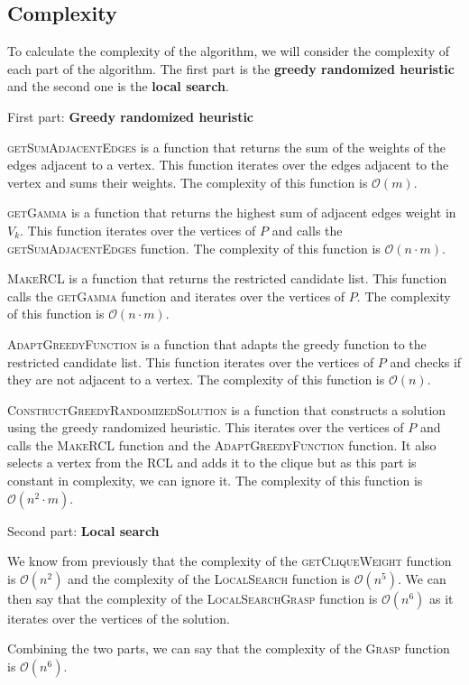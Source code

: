 
\subsection{Complexity}

To calculate the complexity of the algorithm, we will consider the complexity of
each part of the algorithm. The first part is the \textbf{greedy randomized heuristic}
and the second one is the \textbf{local search}.
\bigskip

First part: \textbf{Greedy randomized heuristic}
\bigskip

\textsc{getSumAdjacentEdges} is a function that returns the sum of the weights of
the edges adjacent to a vertex. This function iterates over the edges adjacent to
the vertex and sums their weights. The complexity of this function is $\mathcal{O}(m)$.
\bigskip

\textsc{getGamma} is a function that returns the highest sum of adjacent edges
weight in $V_k$. This function iterates over the vertices of $P$ and calls the
\textsc{getSumAdjacentEdges} function. The complexity of this function is
$\mathcal{O}(n\cdot m)$.
\bigskip

\textsc{MakeRCL} is a function that returns the restricted candidate list. This
function calls the \textsc{getGamma} function and iterates over the vertices of
$P$. The complexity of this function is $\mathcal{O}(n\cdot m)$.
\bigskip

\textsc{AdaptGreedyFunction} is a function that adapts the greedy function to the
restricted candidate list. This function iterates over the vertices of $P$ and
checks if they are not adjacent to a vertex. The complexity of this function is
$\mathcal{O}(n)$.
\bigskip

\textsc{ConstructGreedyRandomizedSolution} is a function that constructs a solution
using the greedy randomized heuristic. This iterates over the vertices of $P$ and
calls the \textsc{MakeRCL} function and the \textsc{AdaptGreedyFunction} function.
It also selects a vertex from the RCL and adds it to the clique but as this part 
is constant in complexity, we can ignore it.
The complexity of this function is $\mathcal{O}(n^2\cdot m)$.
\bigskip

Second part: \textbf{Local search}
\bigskip

We know from previously that the complexity of the \textsc{getCliqueWeight} function
is $\mathcal{O}(n^2)$ and the complexity of the \textsc{LocalSearch} function is
$\mathcal{O}(n^5)$. We can then say that the complexity of the \textsc{LocalSearchGrasp}
function is $\mathcal{O}(n^6)$ as it iterates over the vertices of the solution.
\bigskip

Combining the two parts, we can say that the complexity of the \textsc{Grasp} function
is $\mathcal{O}(n^6)$.